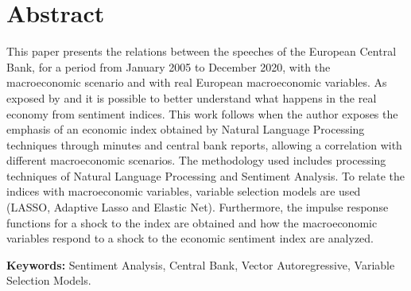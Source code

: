 
\chapter*{Abstract}
This paper presents the relations between the speeches of the European Central Bank, for a period from January 2005 to December 2020, with the macroeconomic scenario and with real European macroeconomic variables. As exposed by \cite[]{shapiro2020measuring, shapiro2021taking} and \cite[]{barsky2012information} it is possible to better understand what happens in the real economy from sentiment indices. This work follows \cite{shapiro2020measuring} when the author exposes the emphasis of an economic index obtained by Natural Language Processing techniques through minutes and central bank reports, allowing a correlation with different macroeconomic scenarios. The methodology used includes processing techniques of Natural Language Processing and Sentiment Analysis. To relate the indices with macroeconomic variables, variable selection models are used (LASSO, Adaptive Lasso and Elastic Net). Furthermore, the impulse response functions for a shock to the index are obtained and how the macroeconomic variables respond to a shock to the economic sentiment index are analyzed.
\par
\vspace{0.5in}    
    
\noindent
{\bf Keywords:} Sentiment Analysis, Central Bank, Vector Autoregressive, Variable Selection Models.



  